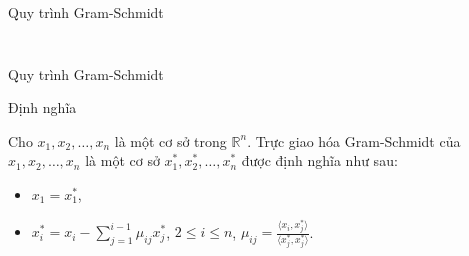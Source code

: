 \begin{frame}{Quy trình Gram-Schmidt}
\begin{columns}
\begin{column}{0.5\textwidth}
\begin{figure}[h]
{

}

\end{figure}
\end{column}

\end{columns}

\end{frame}
\begin{frame}{Quy trình Gram-Schmidt}

\begin{block}{Định nghĩa}

Cho $x_1, x_2, \ldots, x_n$ là một cơ sở trong $\mathbb{R}^n$.
Trực giao hóa Gram-Schmidt của $x_1, x_2, \ldots, x_n$
là một cơ sở $x_1^*, x_2^*, \ldots, x_n^*$ được định nghĩa như sau:

\begin{itemize}
\item $x_1 = x_1^*$,
\item $x_i^* = x_i - \sum_{j=1}^{i-1} \mu_{ij} x_j^*$, \quad $2 \leq i \leq n$, \quad $\mu_{ij} = \frac{\langle x_i, x_j^* \rangle}{\langle x_j^*, x_j^* \rangle}$.
\end{itemize}

\end{block}

\end{frame}
